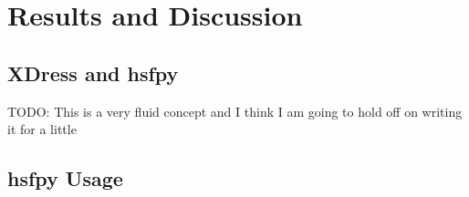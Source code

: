 
\section{Results and Discussion} \label{sec:results_and_discussion}

\subsection{XDress and hsfpy} \label{sub:xdress_and_hsfpy}

TODO: This is a very fluid concept and I think I am going to hold off on writing it for a little

\subsection{hsfpy Usage} \label{sub:hsfpy_usage}

